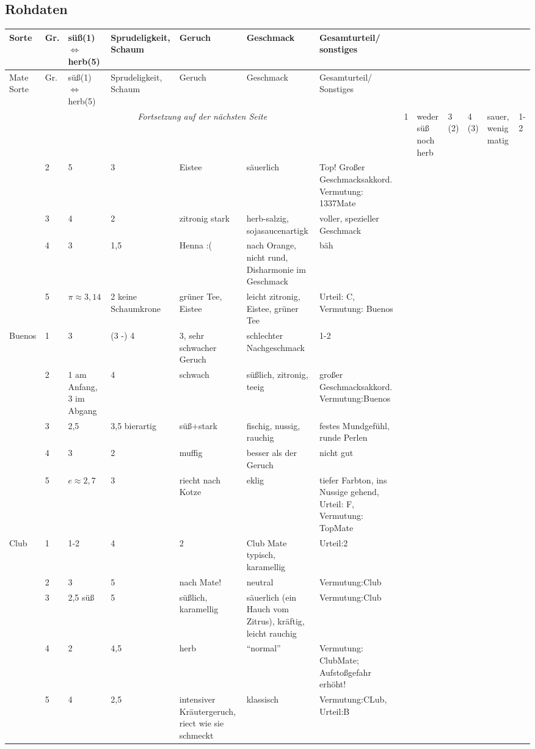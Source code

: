 \documentclass[11pt,a4paper,ngerman]{article}
\begin{document}
\begin{landscape} 
\appendix
\section{Rohdaten}\label{sec:Rohdaten}

\begin{longtable}{|l|l||p{2cm}|p{2cm}|p{4cm}|p{4cm}|p{4cm}|} 
	\hline
	Sorte & Gr. & süß(1) $\Leftrightarrow$ herb(5) & Sprudeligkeit, Schaum & Geruch & Geschmack & Gesamturteil/ sonstiges\\
	\hline\hline
  \endhead 
	\hline
	Mate Sorte & Gr. & süß(1) $\Leftrightarrow$ herb(5)  & Sprudeligkeit, Schaum & Geruch & Geschmack & Gesamturteil/ Sonstiges\\
	\hline\hline
  \endfirsthead
  \multicolumn{7}{c}{\textit{Fortsetzung auf der nächsten Seite}}
  \endfoot
  \endlastfoot

 \multirow{5}{*}{BioZisch}
 & 1 & weder süß noch herb & 3 (2) & 4 (3) & sauer, wenig matig & 1-2\\
\cline{2-7}
 & 2 & 5 & 3 & Eistee & säuerlich & Top! Großer Geschmacksakkord. Vermutung: 1337Mate\\
\cline{2-7}
 & 3 & 4 & 2 & zitronig stark & herb-salzig, sojasaucenartigk&voller, spezieller Geschmack\\
\cline{2-7}
 & 4 & 3 & 1,5 & Henna :( & nach Orange, nicht rund, Disharmonie im Geschmack & bäh\\
\cline{2-7}
 & 5 & $\pi\approx3,14$ & 2 keine Schaumkrone & grüner Tee, Eistee & leicht zitronig, Eistee, grüner Tee& Urteil: C, Vermutung: Buenos\\
\hline\hline\hline

 \multirow{5}{*}{Buenos}
 & 1 & 3 & (3 -) 4& 3, sehr schwacher Geruch & schlechter Nachgeschmack & 1-2\\
\cline{2-7}
 & 2 & 1 am Anfang, 3 im Abgang & 4 & schwach & süßlich, zitronig, teeig & großer Geschmacksakkord. Vermutung:Buenos\\
\cline{2-7}
 & 3 & 2,5 & 3,5 bierartig & süß+stark & fischig, nussig, rauchig & festes Mundgefühl, runde Perlen\\
\cline{2-7}
 & 4 & 3 & 2 & muffig & besser als der Geruch & nicht gut\\
\cline{2-7}
 & 5 & $e\approx 2,7$ & 3 & riecht nach Kotze & eklig & tiefer Farbton, ins Nussige gehend, Urteil: F, Vermutung: TopMate\\
\hline\hline\hline

\multirow{5}{*}{Club}
 & 1 & 1-2 & 4 & 2 & Club Mate typisch, karamellig &  Urteil:2\\
\cline{2-7}
 & 2 & 3 & 5& nach Mate! & neutral & Vermutung:Club \\
\cline{2-7}
 & 3 & 2,5 süß & 5& süßlich, karamellig & säuerlich (ein Hauch vom Zitrus), kräftig, leicht rauchig & Vermutung:Club\\
\cline{2-7}
 & 4 & 2 & 4,5& herb& "`normal"'& Vermutung: ClubMate; Aufstoßgefahr erhöht!\\
\cline{2-7}
 & 5 & 4 & 2,5 & intensiver Kräutergeruch, riect wie sie schmeckt & klassisch & Vermutung:CLub, Urteil:B\\
\hline\hline\hline



\end{longtable}
\end{landscape}
\end{document}
